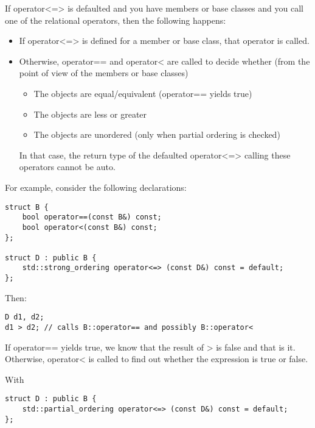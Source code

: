 If operator<=> is defaulted and you have members or base classes and you call one of the relational operators, then the following happens:

\begin{itemize}
\item
If operator<=> is defined for a member or base class, that operator is called.

\item
Otherwise, operator== and operator< are called to decide whether (from the point of view of the members or base classes)

\begin{itemize}
\item
The objects are equal/equivalent (operator== yields true)

\item
The objects are less or greater

\item
The objects are unordered (only when partial ordering is checked)
\end{itemize}

In that case, the return type of the defaulted operator<=> calling these operators cannot be auto.
\end{itemize}

For example, consider the following declarations:

\begin{lstlisting}[style=styleCXX]
struct B {
	bool operator==(const B&) const;
	bool operator<(const B&) const;
};

struct D : public B {
	std::strong_ordering operator<=> (const D&) const = default;
};
\end{lstlisting}

Then:

\begin{lstlisting}[style=styleCXX]
D d1, d2;
d1 > d2; // calls B::operator== and possibly B::operator<
\end{lstlisting}

If operator== yields true, we know that the result of > is false and that is it. Otherwise, operator< is called to find out whether the expression is true or false.

With

\begin{lstlisting}[style=styleCXX]
struct D : public B {
	std::partial_ordering operator<=> (const D&) const = default;
};
\end{lstlisting}


